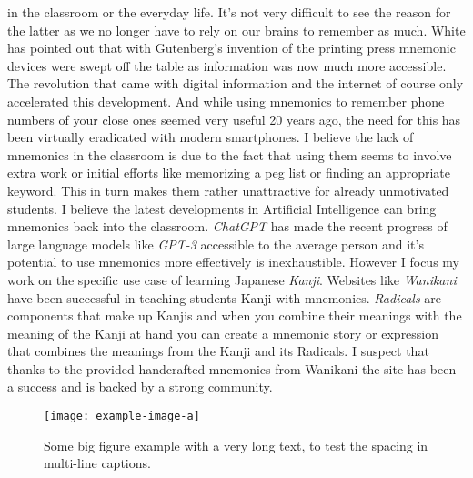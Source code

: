 in the classroom or the everyday life. It's not very difficult to see the reason for the latter as we no longer have to rely on our brains to remember as much. White has pointed out that with Gutenberg's invention of the printing press mnemonic devices were swept off the table as information was now much more accessible. \cite{white_2014} The revolution that came with digital information and the internet of course only accelerated this development. And while using mnemonics to remember phone numbers of your close ones seemed very useful 20 years ago, the need for this has been virtually eradicated with modern smartphones.
I believe the lack of mnemonics in the classroom is due to the fact that using them seems to involve extra work or initial efforts like memorizing a peg list or finding an appropriate keyword. This in turn makes them rather unattractive for already unmotivated students.
I believe the latest developments in Artificial Intelligence can bring mnemonics back into the classroom. \emph{ChatGPT} has made the recent progress of large language models like \emph{GPT-3} accessible to the average person and it's potential to use mnemonics more effectively is inexhaustible. However I focus my work on the specific use case of learning Japanese \emph{Kanji}. Websites like \emph{Wanikani} \cite{wanikani} have been successful in teaching students Kanji with mnemonics. \emph{Radicals} are components that make up Kanjis and when you combine their meanings with the meaning of the Kanji at hand you can create a mnemonic story or expression that combines the meanings from the Kanji and its Radicals. I suspect that thanks to the provided handcrafted mnemonics from Wanikani the site has been a success and is backed by a strong community. 
\begin{figure}
    \centering
    \texttt{[image: example-image-a]}
    \caption{Some big figure example with a very long text, to test the spacing in multi-line captions.}
    \label{figure:example_figure}
\end{figure}


